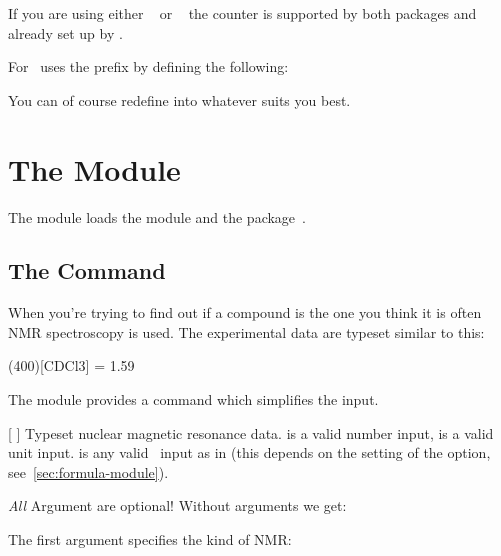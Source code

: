 \documentclass{chemmacros-manual}
\begin{document}
If you are using either ~\cite{pkg:cleveref}
or ~\cite{pkg:fancyref} the  counter is supported by
both packages and already set up by \chemmacros.

For  \chemmacros\ uses the prefix  by defining the
following:
\begin{sourcecode}
  \newcommand*\fancyrefschlabelprefix{sch}
\end{sourcecode}
You can of course redefine  into whatever suits you
best.

\section{The  Module}\label{sec:spectroscopy-module}

The  module loads the  module
and the  package~\cite{pkg:siunitx}.

\subsection{The  Command}

When you're trying to find out if a compound is the one you think it is often
NMR spectroscopy is used.  The experimental data are typeset similar to this:
\begin{center}
  \NMR(400)[CDCl3] = \num{1.59}
\end{center}
The  module provides a command which simplifies the
input.

\begin{commands}
  [\sarg{}%
    ]
    Typeset nuclear magnetic resonance data.  is a valid
     number input,  is a valid  unit
    input.   is any valid \chemformula\ input as in 
    (this depends on the setting of the  option,
    see~\vref{sec:formula-module}).
\end{commands}

\emph{All} Argument are optional! Without arguments we get:
\begin{example}
  \NMR \par
  \NMR*
\end{example}

The first argument specifies the kind of NMR:
\begin{example}
\end{example}
\end{document}
